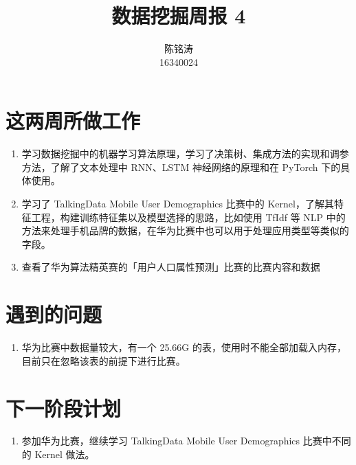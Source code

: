 \documentclass[12pt]{article}
\begin{document}
\author{陈铭涛\\16340024}
\title{数据挖掘周报 4}
\maketitle

\medskip


\section{这两周所做工作}
\begin{enumerate}
    \item 学习数据挖掘中的机器学习算法原理，学习了决策树、集成方法的实现和调参方法，了解了文本处理中 RNN、LSTM 神经网络的原理和在 PyTorch 下的具体使用。
    \item 学习了 TalkingData Mobile User Demographics 比赛中的 Kernel，了解其特征工程，构建训练特征集以及模型选择的思路，比如使用 TfIdf 等 NLP 中的方法来处理手机品牌的数据，在华为比赛中也可以用于处理应用类型等类似的字段。
    \item 查看了华为算法精英赛的「用户人口属性预测」比赛的比赛内容和数据
\end{enumerate}

\section{遇到的问题}
\begin{enumerate}
    \item 华为比赛中数据量较大，有一个 25.66G 的表，使用时不能全部加载入内存，目前只在忽略该表的前提下进行比赛。
\end{enumerate}


\section{下一阶段计划}

\begin{enumerate}
    \item 参加华为比赛，继续学习 TalkingData Mobile User Demographics 比赛中不同的 Kernel 做法。
\end{enumerate}
\end{document}
